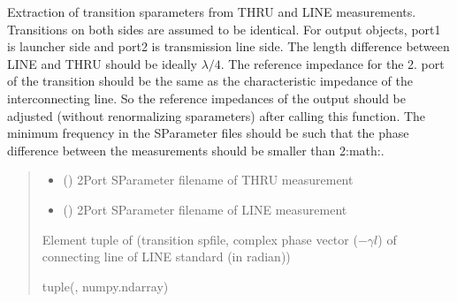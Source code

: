 \documentclass[letterpaper,10pt,english]{sphinxmanual}
\begin{document}

\begin{fulllineitems}
\label{\detokenize{touchstone:touchstone.thru_line_deembedding}}
\pysigstartsignatures
{}
\pysigstopsignatures
\sphinxAtStartPar
Extraction of transition s\sphinxhyphen{}parameters from THRU and LINE measurements. Transitions on both sides are assumed to be identical. For output  objects, port\sphinxhyphen{}1 is launcher side and port\sphinxhyphen{}2 is transmission line side. The length difference between LINE and THRU should be ideally \(\lambda/4\).
The reference impedance for the 2. port of the transition should be the same as the characteristic impedance of the interconnecting line. So the reference impedances of the output  should be adjusted (without renormalizing s\sphinxhyphen{}parameters) after calling this function. The minimum frequency in the S\sphinxhyphen{}Parameter files should be such that the phase difference between the measurements should be smaller than 2:math:.
\begin{quote}\begin{description}
\begin{itemize}
\item {} 
\sphinxAtStartPar
{} () \textendash{} 2\sphinxhyphen{}Port S\sphinxhyphen{}Parameter filename of THRU measurement

\item {} 
\sphinxAtStartPar
{} () \textendash{} 2\sphinxhyphen{}Port S\sphinxhyphen{}Parameter filename of LINE measurement

\end{itemize}

\sphinxhyphen{}Element tuple of (transition spfile, complex phase vector (\(-\gamma l\)) of connecting line of LINE standard (in radian))

\sphinxAtStartPar
tuple({\hyperref[\detokenize{touchstone:touchstone.spfile}]{}}, numpy.ndarray)

\end{description}\end{quote}

\end{fulllineitems}
\end{document}

